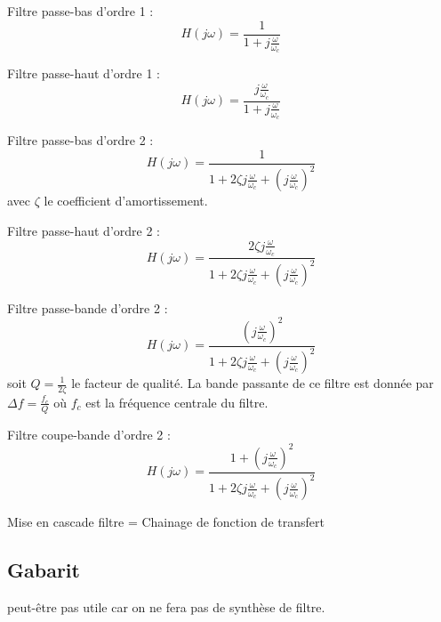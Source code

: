 \documentclass[]{book}
\begin{document}
{	Filtre passe-bas d'ordre 1 :
	\begin{equation}\label{key}
	H(j\omega) = \frac{1}{1+j\frac{\omega}{\omega_{c}}}
	\end{equation}
	
	Filtre passe-haut d'ordre 1 :
	\begin{equation}\label{key}
	H(j\omega) = \frac{j\frac{\omega}{\omega_{c}}}{1+j\frac{\omega}{\omega_{c}}}
	\end{equation}
	
	Filtre passe-bas d'ordre 2 :
	\begin{equation}\label{key}
	H(j\omega) = \frac{1}{1+2\zeta j\frac{\omega}{\omega_{c}}+(j\frac{\omega}{\omega_{c}})^{2}}
	\end{equation}
	avec $\zeta$ le coefficient d'amortissement.
	\newline
	
	Filtre passe-haut d'ordre 2 :
	\begin{equation}\label{key}
	H(j\omega) = \frac{2\zeta j\frac{\omega}{\omega_{c}}}{1+2\zeta j\frac{\omega}{\omega_{c}}+(j\frac{\omega}{\omega_{c}})^{2}}
	\end{equation}
	
	Filtre passe-bande d'ordre 2 :
	\begin{equation}\label{key}
	H(j\omega) = \frac{(j\frac{\omega}{\omega_{c}})^{2}}{1+2\zeta j\frac{\omega}{\omega_{c}}+(j\frac{\omega}{\omega_{c}})^{2}}
	\end{equation}
	soit $Q = \frac{1}{2\zeta}$ le facteur de qualité. La bande passante de ce filtre est donnée par $\Delta f=\frac{f_{c}}{Q}$ où $f_{c}$ est la fréquence centrale du filtre.
	
	Filtre coupe-bande d'ordre 2 :
	\begin{equation}\label{key}
	H(j\omega) = \frac{1+(j\frac{\omega}{\omega_{c}})^{2}}{1+2\zeta j\frac{\omega}{\omega_{c}}+(j\frac{\omega}{\omega_{c}})^{2}}
	\end{equation}
	
	
	Mise en cascade filtre = Chainage de fonction de transfert
	
	\subsection{Gabarit}
	peut-être pas utile car on ne fera pas de synthèse de filtre.
	
}
\end{document}
